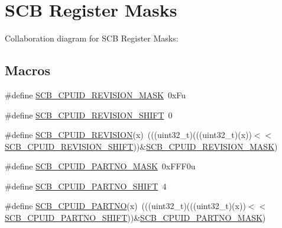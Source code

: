 \hypertarget{group___s_c_b___register___masks}{}\section{S\+CB Register Masks}
\label{group___s_c_b___register___masks}
Collaboration diagram for S\+CB Register Masks\+:
\subsection*{Macros}
\begin{DoxyCompactItemize}
\item 
\#define \hyperlink{group___s_c_b___register___masks_ga85fcec5a1a285bf2ead09d715e7fd825}{S\+C\+B\+\_\+\+C\+P\+U\+I\+D\+\_\+\+R\+E\+V\+I\+S\+I\+O\+N\+\_\+\+M\+A\+SK}~0x\+Fu
\item 
\#define \hyperlink{group___s_c_b___register___masks_ga6c4bd208cc5af38612bf38b291f8312d}{S\+C\+B\+\_\+\+C\+P\+U\+I\+D\+\_\+\+R\+E\+V\+I\+S\+I\+O\+N\+\_\+\+S\+H\+I\+FT}~0
\item 
\#define \hyperlink{group___s_c_b___register___masks_ga373e184611c0c22cc1aae46fd5cca3bb}{S\+C\+B\+\_\+\+C\+P\+U\+I\+D\+\_\+\+R\+E\+V\+I\+S\+I\+ON}(x)~(((uint32\+\_\+t)(((uint32\+\_\+t)(x))$<$$<$\hyperlink{group___s_c_b___register___masks_ga6c4bd208cc5af38612bf38b291f8312d}{S\+C\+B\+\_\+\+C\+P\+U\+I\+D\+\_\+\+R\+E\+V\+I\+S\+I\+O\+N\+\_\+\+S\+H\+I\+FT}))\&\hyperlink{group___s_c_b___register___masks_ga85fcec5a1a285bf2ead09d715e7fd825}{S\+C\+B\+\_\+\+C\+P\+U\+I\+D\+\_\+\+R\+E\+V\+I\+S\+I\+O\+N\+\_\+\+M\+A\+SK})
\item 
\#define \hyperlink{group___s_c_b___register___masks_ga59f6aaadd9ecf7fed4e622ab8052f8d4}{S\+C\+B\+\_\+\+C\+P\+U\+I\+D\+\_\+\+P\+A\+R\+T\+N\+O\+\_\+\+M\+A\+SK}~0x\+F\+F\+F0u
\item 
\#define \hyperlink{group___s_c_b___register___masks_gac28acf4ce5242a53961b9549e7dd0115}{S\+C\+B\+\_\+\+C\+P\+U\+I\+D\+\_\+\+P\+A\+R\+T\+N\+O\+\_\+\+S\+H\+I\+FT}~4
\item 
\#define \hyperlink{group___s_c_b___register___masks_gab245ae8d984e1c60ab16b8cd4d074b00}{S\+C\+B\+\_\+\+C\+P\+U\+I\+D\+\_\+\+P\+A\+R\+T\+NO}(x)~(((uint32\+\_\+t)(((uint32\+\_\+t)(x))$<$$<$\hyperlink{group___s_c_b___register___masks_gac28acf4ce5242a53961b9549e7dd0115}{S\+C\+B\+\_\+\+C\+P\+U\+I\+D\+\_\+\+P\+A\+R\+T\+N\+O\+\_\+\+S\+H\+I\+FT}))\&\hyperlink{group___s_c_b___register___masks_ga59f6aaadd9ecf7fed4e622ab8052f8d4}{S\+C\+B\+\_\+\+C\+P\+U\+I\+D\+\_\+\+P\+A\+R\+T\+N\+O\+\_\+\+M\+A\+SK})

\end{DoxyCompactItemize}
